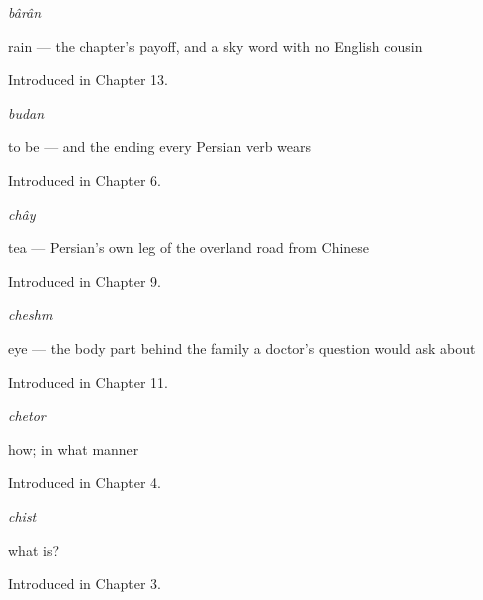\noindent\begin{minipage}[t]{\linewidth}
\raggedright
\textbf{}\enspace\emph{bârân}\par
\small rain — the chapter's payoff, and a sky word with no English cousin\par
\footnotesize Introduced in Chapter 13.
\end{minipage}\par\medskip

\noindent\begin{minipage}[t]{\linewidth}
\raggedright
\textbf{}\enspace\emph{budan}\par
\small to be — and the ending every Persian verb wears\par
\footnotesize Introduced in Chapter 6.
\end{minipage}\par\medskip

\noindent\begin{minipage}[t]{\linewidth}
\raggedright
\textbf{}\enspace\emph{chây}\par
\small tea — Persian's own leg of the overland road from Chinese\par
\footnotesize Introduced in Chapter 9.
\end{minipage}\par\medskip

\noindent\begin{minipage}[t]{\linewidth}
\raggedright
\textbf{}\enspace\emph{cheshm}\par
\small eye — the body part behind the family a doctor's question would ask about\par
\footnotesize Introduced in Chapter 11.
\end{minipage}\par\medskip

\noindent\begin{minipage}[t]{\linewidth}
\raggedright
\textbf{}\enspace\emph{chetor}\par
\small how; in what manner\par
\footnotesize Introduced in Chapter 4.
\end{minipage}\par\medskip

\noindent\begin{minipage}[t]{\linewidth}
\raggedright
\textbf{}\enspace\emph{chist}\par
\small what is?\par
\footnotesize Introduced in Chapter 3.
\end{minipage}\par\medskip


